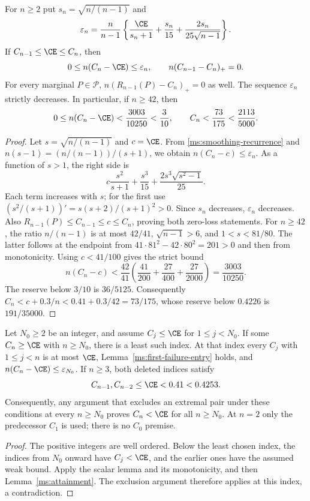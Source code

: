 \begin{lemma}
\label{ms:first-failure-entry}
For $n\ge2$ put $s_n=\sqrt{n/(n-1)}$ and
\begin{equation}\label{ms:first-failure-excess}
 \varepsilon_n=\frac n{n-1}
 \left\{\frac{\CE}{s_n+1}+\frac{s_n}{15}
                     +\frac{2s_n}{25\sqrt{n-1}}\right\}.
\end{equation}
If $C_{n-1}\le\CE\le C_n$, then
\[
 0\le n(C_n-\CE)\le\varepsilon_n,\qquad
 n(C_{n-1}-C_n)_+=0.
\]
For every marginal $P\in\mathcal P$,
$n(R_{n-1}(P)-C_n)_+=0$ as well. The sequence $\varepsilon_n$
strictly decreases. In particular, if $n\ge42$, then
\[
 0\le n(C_n-\CE)<\frac{3003}{10250}<\frac3{10},\qquad
 C_n<\frac{73}{175}<\frac{2113}{5000}.
\]
\end{lemma}
\begin{proof}
Let $s=\sqrt{n/(n-1)}$ and $c=\CE$. From
\eqref{ms:smoothing-recurrence} and
$n(s-1)=(n/(n-1))/(s+1)$, we obtain
$n(C_n-c)\le\varepsilon_n$.
As a function of $s>1$, the right side is
\[
 c\frac{s^2}{s+1}+\frac{s^3}{15}
                       +\frac{2s^3\sqrt{s^2-1}}{25}.
\]
Each term increases with $s$; for the first use
$(s^2/(s+1))'=s(s+2)/(s+1)^2>0$. Since $s_n$ decreases,
$\varepsilon_n$ decreases. Also
$R_{n-1}(P)\le C_{n-1}\le c\le C_n$, proving both zero-loss statements.
For $n\ge42$, the ratio $n/(n-1)$ is at most $42/41$,
$\sqrt{n-1}>6$, and $1<s<81/80$. The latter follows at the endpoint
from $41\cdot81^2-42\cdot80^2=201>0$ and then from monotonicity.
Using $c<41/100$ gives the strict bound
\[
 n(C_n-c)<\frac{42}{41}
 \left(\frac{41}{200}+\frac{27}{400}+\frac{27}{2000}\right)
 =\frac{3003}{10250}.
\]
The reserve below $3/10$ is $36/5125$. Consequently
$C_n<c+0.3/n<0.41+0.3/42=73/175$, whose reserve below $0.4226$ is
$191/35000$.
\end{proof}

\begin{proposition}
\label{ms:least-contrary}
Let $N_0\ge2$ be an integer, and assume $C_j\le\CE$ for
$1\le j<N_0$. If some $C_n\ge\CE$ with $n\ge N_0$, there is a least
such index. At that index every $C_j$ with $1\le j<n$ is at most
$\CE$, Lemma~\ref{ms:first-failure-entry} holds, and
$n(C_n-\CE)\le\varepsilon_{N_0}$. If $n\ge3$, both deleted indices satisfy
\[
 C_{n-1},C_{n-2}\le\CE<0.41<0.4253.
\]
Consequently, any argument that excludes an extremal pair under these
conditions at every $n\ge N_0$ proves $C_n<\CE$ for all $n\ge N_0$.
At $n=2$ only the predecessor $C_1$ is used; there is no $C_0$ premise.
\end{proposition}
\begin{proof}
The positive integers are well ordered. Below the least chosen index,
the indices from $N_0$ onward have $C_j<\CE$, and the earlier ones have the
assumed weak bound. Apply the scalar lemma and its monotonicity, and
then Lemma~\ref{ms:attainment}. The exclusion argument therefore applies at this
index, a contradiction.
\end{proof}

